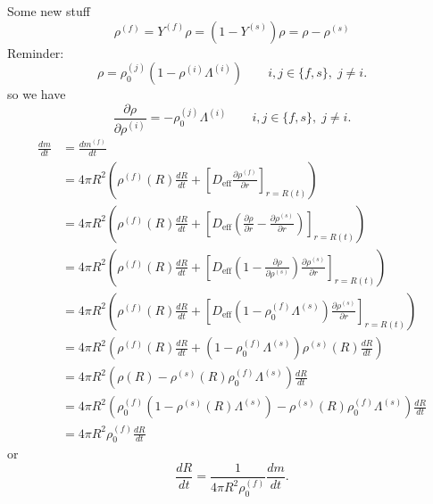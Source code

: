 \documentclass[12pt]{report}
\begin{document}
Some new stuff
\begin{equation*}
  \rho^{(f)} = Y^{(f)} \rho = (1 - Y^{(s)}) \rho = \rho - \rho^{(s)}
\end{equation*}
Reminder:
\begin{equation*}
  \rho =
  \rho^{(j)}_0 (1 - \rho^{(i)} \Lambda^{(i)})
  \qquad i,j \in \{f,s\}, \; j \ne i.
\end{equation*}
so we have
\begin{equation*}
  \frac{\partial \rho}{\partial \rho^{(i)}} =
  - \rho^{(j)}_0 \Lambda^{(i)}
  \qquad i,j \in \{f,s\}, \; j \ne i.
\end{equation*}
\begin{equation}
  \begin{aligned}
    \frac{d m}{dt} &=
    \frac{d m^{(f)}}{dt} \\
    &=
    4 \pi R^2
    \left(
    \rho^{(f)}(R)  \frac{dR}{dt} +
    \left[
    D_{\textrm{eff}}
    \frac{\partial \rho^{(f)}}{\partial r}
    \right]_{r=R(t)}
    \right) \\
    &=
    4 \pi R^2
    \left(
    \rho^{(f)}(R)
    \frac{dR}{dt} +
    \left[
    D_{\textrm{eff}}
    \left(
    \frac{\partial \rho}{\partial r} -
    \frac{\partial \rho^{(s)}}{\partial r}
    \right)
    \right]_{r=R(t)}
    \right) \\
    &=
    4 \pi R^2
    \left(
    \rho^{(f)}(R)
    \frac{dR}{dt} +
    \left[
    D_{\textrm{eff}}
    \left(
    1 - \frac{\partial \rho}{\partial \rho^{(s)}}
    \right)
    \frac{\partial \rho^{(s)}}{\partial r}
    \right]_{r=R(t)}
    \right) \\
    &=
    4 \pi R^2
    \left(
    \rho^{(f)}(R)
    \frac{dR}{dt} +
    \left[
    D_{\textrm{eff}}
    \left(
    1 - \rho^{(f)}_0 \Lambda^{(s)}
    \right)
    \frac{\partial \rho^{(s)}}{\partial r}
    \right]_{r=R(t)}
    \right) \\
    &=
    4 \pi R^2
    \left(
    \rho^{(f)}(R)
    \frac{dR}{dt} +
    \left( 1 - \rho^{(f)}_0 \Lambda^{(s)} \right)
    \rho^{(s)}(R)
    \frac{d R}{d t}
    \right) \\
    &=
    4 \pi R^2
    \left(
    \rho(R) - \rho^{(s)}(R) \rho^{(f)}_0 \Lambda^{(s)}
    \right)
    \frac{dR}{dt} \\
    &=
    4 \pi R^2
    \left(
    \rho_0^{(f)}(1 - \rho^{(s)}(R) \Lambda^{(s)}) - \rho^{(s)}(R) \rho^{(f)}_0 \Lambda^{(s)}
    \right)
    \frac{dR}{dt} \\
    &=
    4 \pi R^2 \rho_0^{(f)} \frac{dR}{dt}
  \end{aligned}
\end{equation}
or
\begin{equation}
  \frac{dR}{dt} =
  \frac{1}{4\pi R^2 \rho^{(f)}_0} \frac{dm}{dt}.
\end{equation}
\end{document}
